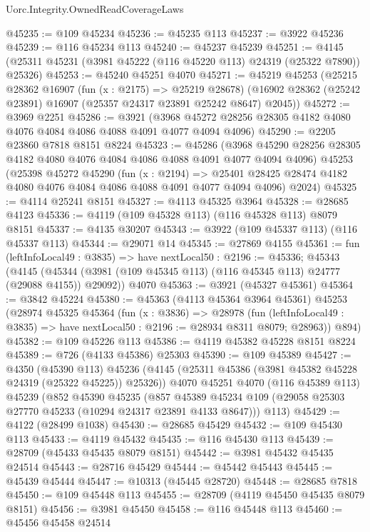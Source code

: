\begin{lexlean}{Uorc.Integrity.OwnedReadCoverageLaws}
\begin{coremodule}
@45235 := @109 @45234
@45236 := @45235 @113
@45237 := @3922 @45236
@45239 := @116 @45234 @113
@45240 := @45237 @45239
@45251 := @4145 (@25311 @45231 (@3981 @45222 (@116 @45220 @113) @24319 (@25322 @7890)) @25326)
@45253 := @45240 @45251 @4070
@45271 := @45219
    @45253
    (@25215
      @28362
      @16907
      (fun (x : @2175) => @25219 @28678)
      (@16902 @28362 (@25242 @23891) @16907 (@25357 @24317 @23891 @25242 @8647) @2045))
@45272 := @3969 @2251
@45286 := @3921
    (@3968 @45272 @28256 @28305 @4182 @4080 @4076 @4084 @4086 @4088 @4091 @4077 @4094 @4096)
@45290 := @2205 @23860 @7818 @8151 @8224
@45323 := @45286
    (@3968 @45290 @28256 @28305 @4182 @4080 @4076 @4084 @4086 @4088 @4091 @4077 @4094 @4096)
    @45253
    (@25398
      @45272
      @45290
      (fun (x : @2194) =>
      @25401 @28425 @28474 @4182 @4080 @4076 @4084 @4086 @4088 @4091 @4077 @4094 @4096)
      @2024)
@45325 := @4114 @25241 @8151
@45327 := @4113 @45325 @3964
@45328 := @28685 @4123
@45336 := @4119 (@109 @45328 @113) (@116 @45328 @113) @8079 @8151
@45337 := @4135 @30207
@45343 := @3922 (@109 @45337 @113) (@116 @45337 @113)
@45344 := @29071 @14
@45345 := @27869 @4155
@45361 := fun (leftInfoLocal49 : @3835) =>
  have nextLocal50 : @2196 := @45336;
  @45343
    (@4145 (@45344 (@3981 (@109 @45345 @113) (@116 @45345 @113) @24777 (@29088 @4155)) @29092))
    @4070
@45363 := @3921 (@45327 @45361)
@45364 := @3842 @45224
@45380 := @45363
    (@4113 @45364 @3964 @45361)
    @45253
    (@28974
      @45325
      @45364
      (fun (x : @3836) =>
      @28978
        (fun (leftInfoLocal49 : @3835) => have nextLocal50 : @2196 := @28934 @8311 @8079; @28963))
      @894)
@45382 := @109 @45226 @113
@45386 := @4119 @45382 @45228 @8151 @8224
@45389 := @726 (@4133 @45386) @25303
@45390 := @109 @45389
@45427 := @4350
    (@45390 @113)
    @45236
    (@4145 (@25311 @45386 (@3981 @45382 @45228 @24319 (@25322 @45225)) @25326))
    @4070
    @45251
    @4070
    (@116 @45389 @113)
    @45239
    (@852
      @45390
      @45235
      (@857 @45389 @45234 @109 (@29058 @25303 @27770 @45233 (@10294 @24317 @23891 @4133 @8647)))
      @113)
@45429 := @4122 (@28499 @1038)
@45430 := @28685 @45429
@45432 := @109 @45430 @113
@45433 := @4119 @45432
@45435 := @116 @45430 @113
@45439 := @28709 (@45433 @45435 @8079 @8151)
@45442 := @3981 @45432 @45435 @24514
@45443 := @28716 @45429
@45444 := @45442 @45443
@45445 := @45439 @45444
@45447 := @10313 (@45445 @28720)
@45448 := @28685 @7818
@45450 := @109 @45448 @113
@45455 := @28709 (@4119 @45450 @45435 @8079 @8151)
@45456 := @3981 @45450
@45458 := @116 @45448 @113
@45460 := @45456 @45458 @24514

\end{coremodule}
\end{lexlean}
